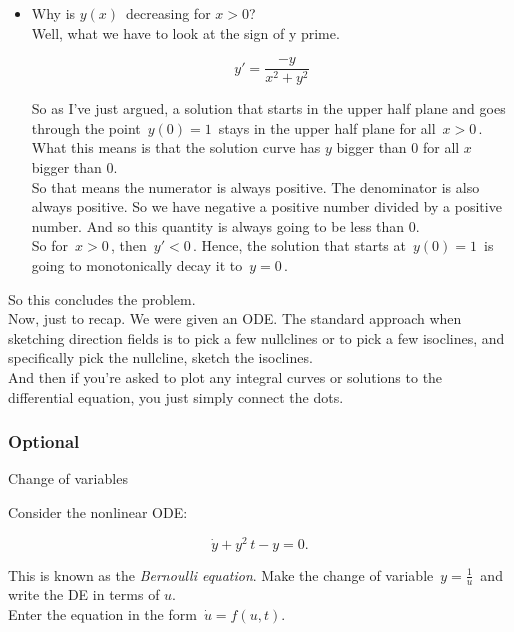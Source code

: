 \begin{enumerate}
\begin{itemize}
  \item Why is $y(x)\,$ decreasing for $x > 0$?  \\
    Well, what we have to look at  the sign of y prime.
    
    \begin{equation*}
      y' = \frac{-y}{x^2 + y^2}
    \end{equation*}
    
    So as I've just argued, a solution  that starts in the upper half plane
    and goes through the point $\, y(0) = 1 \,$ stays in the upper half
    plane for all $\, x > 0 \, $.\\
    What this means is that the solution curve has $y$ bigger than $0$ for all $x$ bigger than $0$.\\
    So that means the numerator is always positive.
    The denominator is also always positive.
    So we have negative a positive number divided by a positive number.
    And so this quantity is always going to be less than $0$.\\
    So for $\, x > 0 \,$, then $\, y' <  0\, $.
    Hence, the solution that starts at $\, y(0) = 1\, $ is going to monotonically decay it
    to $\, y = 0 \, $.
  \end{itemize}
  So this concludes the problem. \\    
  Now, just to recap.
  We were given an ODE.
  The standard approach when sketching direction fields is to pick a few nullclines or
  to pick a few isoclines,  and specifically pick the nullcline, sketch the isoclines. \\
  And then if you're asked to plot any integral curves
  or solutions to the differential equation,  you just simply connect the dots.
\end{enumerate}

\clearpage

\subsubsection{Optional}

\begin{exercise}
  Change of variables
\end{exercise}

Consider the nonlinear ODE:

\begin{equation*}
  \dot{y}+y^2\, t-y =0.
\end{equation*}

This is known as the \emph{Bernoulli equation}.
Make the change of variable  $\, y = \frac{1}{u} \,$
and write the DE in terms of $u$. \\
Enter the equation in the form $\, \dot{u}= f(u,t)$.

